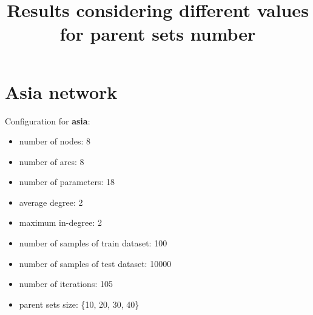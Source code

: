 \documentclass[]{scrartcl}
\title{Results considering different values for parent sets number}
\author{}
\begin{document}
\maketitle

\begin{abstract}

\end{abstract}

\section{Asia network}

Configuration for \textbf{asia}:

\begin{itemize}
\item number of nodes: 8
\item number of arcs: 8
\item number of parameters: 18
\item average degree: 2
\item maximum in-degree: 2
\item number of samples of train dataset: 100
\item number of samples of test dataset: 10000
\item number of iterations: 105
\item parent sets size: \{10, 20, 30, 40\}
\end{itemize}
\end{document}
